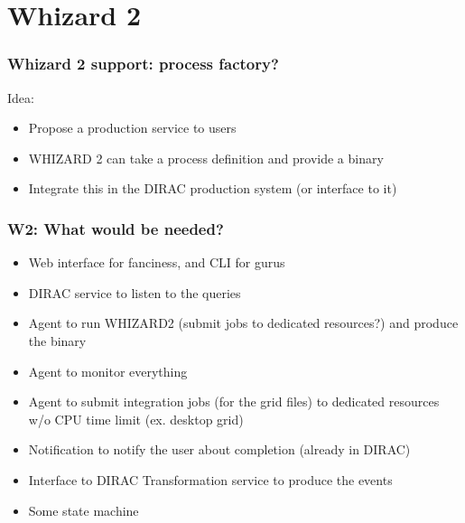 \documentclass[10pt,table,dvipsnames]{beamer}
\begin{document}
\section{Whizard 2}
\label{sec:whiz2}
\begin{frame}
  \frametitle{Whizard 2 support: process factory?}
Idea:
\begin{itemize}
\item Propose a production service to users
\item WHIZARD 2 can take a process definition and provide a binary
\item Integrate this in the DIRAC production system (or interface to
  it)
\end{itemize}
\end{frame}
\begin{frame}
  \frametitle{W2: What would be needed?}
  \begin{itemize}
  \item Web interface for fanciness, and CLI for gurus
  \item DIRAC service to listen to the queries
  \item Agent to run WHIZARD2 (submit jobs to dedicated resources?) and produce the binary
  \item Agent to monitor everything
  \item Agent to submit integration jobs (for the grid files) to dedicated resources w/o CPU time limit (ex. desktop grid)
  \item Notification to notify the user about completion (already in DIRAC)
  \item Interface to DIRAC Transformation service to produce the
    events
  \item Some state machine
  \end{itemize}
\end{frame}
\end{document}
